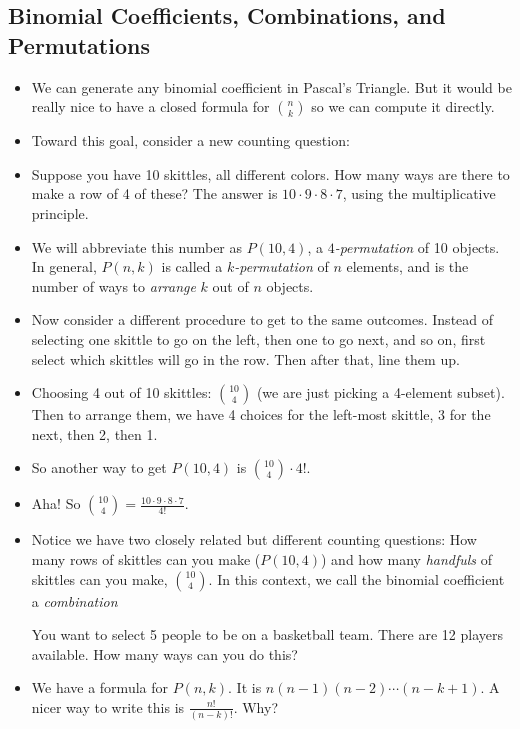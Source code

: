 \documentclass[12pt]{article}
\theoremstyle{plain}
\theoremstyle{definition}
\theoremstyle{remark}
\newcommand{\ex}{\noindent{\bf Ex: }}
\begin{document}
\subsection*{Binomial Coefficients, Combinations, and Permutations}
\begin{itemize}

\item We can generate any binomial coefficient in Pascal's Triangle.  But it would be really nice to have a closed formula for ${n \choose k}$ so we can compute it directly.

\item Toward this goal, consider a new counting question:

	\item Suppose you have 10 skittles, all different colors.  How many ways are there to make a row of 4 of these?  The answer is $10\cdot 9 \cdot 8 \cdot 7$, using the multiplicative principle.
	\item We will abbreviate this number as $P(10,4)$, a \emph{$4$-permutation} of 10 objects.  In general, $P(n,k)$ is called a \emph{$k$-permutation} of $n$ elements, and is the number of ways to \emph{arrange} $k$ out of $n$ objects.
  \item Now consider a different procedure to get to the same outcomes.  Instead of selecting one skittle to go on the left, then one to go next, and so on, first select which skittles will go in the row.  Then after that, line them up.
  \item Choosing 4 out of 10 skittles: ${10 \choose 4}$ (we are just picking a 4-element subset).  Then to arrange them, we have 4 choices for the left-most skittle, 3 for the next, then 2, then 1.
  \item So another way to get $P(10,4)$ is ${10 \choose 4}\cdot 4!$.
  \item Aha! So ${10 \choose 4} = \frac{10\cdot 9 \cdot 8 \cdot 7}{4!}$.


  \item Notice we have two closely related but different counting questions: How many rows of skittles can you make ($P(10,4)$) and how many \emph{handfuls} of skittles can you make, ${10 \choose 4}$.  In this context, we call the binomial coefficient a \emph{combination}



   \ex You want to select 5 people to be on a basketball team.  There are 12 players available.  How many ways can you do this?


   \item We have a formula for $P(n,k)$.  It is $n(n-1)(n-2)\cdots(n-k+1)$.  A nicer way to write this is $\frac{n!}{(n-k)!}$.   Why?




\end{itemize}
\end{document}
